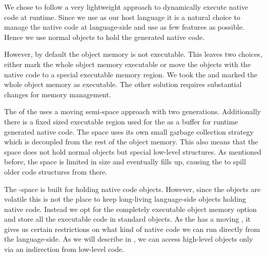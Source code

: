 We chose to follow a very lightweight approach to dynamically execute native code at runtime. 
Since we use \PH as our host language it is a natural choice to manage the native code at language-side and use as few \VM features as possible.
Hence we use normal \PH objects to hold the generated native code.

However, by default the object memory is not executable.
This leaves two choices, either mark the whole object memory executable or move the objects with the native code to a special executable memory region.
We took the  and marked the whole object memory as executable.
The other solution requires substantial changes for memory management. 

The \GC of the \PH \VM uses a moving semi-space approach with two generations.
Additionally there is a fixed sized executable region used for the \JIT as a buffer for runtime generated native code.
The \JIT space uses its own small garbage collection strategy which is decoupled from the rest of the object memory.
This also means that the \JIT space does not hold normal \PH objects but special low-level structures.
As mentioned before, the \JIT space is limited in size and eventually fills up, causing the \JIT to spill older code structures from there. 

The \JIT-space is built for holding native code objects.
However, since the \JIT objects are volatile this is not the place to keep long-living language-side objects holding native code.
Instead we opt for the completely executable object memory option and store all the executable code in standard \PH objects.
As the \VM has a moving \GC, it gives us certain restrictions on what kind of native code we can run directly from the language-side. 
As we will describe in , we can access high-level \PH objects only via an indirection from low-level code.

